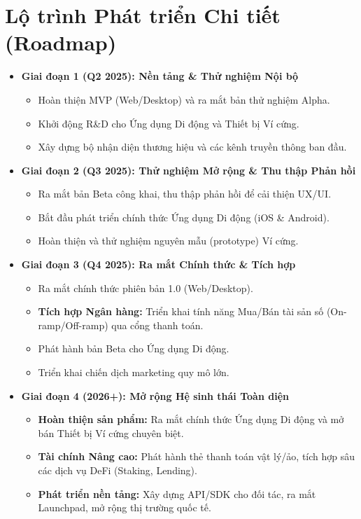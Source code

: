 \section{Lộ trình Phát triển Chi tiết (Roadmap)}

\begin{itemize}
    \item \textbf{Giai đoạn 1 (Q2 2025): Nền tảng \& Thử nghiệm Nội bộ}
    \begin{itemize}
        \item Hoàn thiện MVP (Web/Desktop) và ra mắt bản thử nghiệm Alpha.
        \item Khởi động R\&D cho Ứng dụng Di động và Thiết bị Ví cứng.
        \item Xây dựng bộ nhận diện thương hiệu và các kênh truyền thông ban đầu.
    \end{itemize}

    \item \textbf{Giai đoạn 2 (Q3 2025): Thử nghiệm Mở rộng \& Thu thập Phản hồi}
    \begin{itemize}
        \item Ra mắt bản Beta công khai, thu thập phản hồi để cải thiện UX/UI.
        \item Bắt đầu phát triển chính thức Ứng dụng Di động (iOS \& Android).
        \item Hoàn thiện và thử nghiệm nguyên mẫu (prototype) Ví cứng.
    \end{itemize}

    \item \textbf{Giai đoạn 3 (Q4 2025): Ra mắt Chính thức \& Tích hợp}
    \begin{itemize}
        \item Ra mắt chính thức phiên bản 1.0 (Web/Desktop).
        \item \textbf{Tích hợp Ngân hàng:} Triển khai tính năng Mua/Bán tài sản số (On-ramp/Off-ramp) qua cổng thanh toán.
        \item Phát hành bản Beta cho Ứng dụng Di động.
        \item Triển khai chiến dịch marketing quy mô lớn.
    \end{itemize}

    \item \textbf{Giai đoạn 4 (2026+): Mở rộng Hệ sinh thái Toàn diện}
    \begin{itemize}
        \item \textbf{Hoàn thiện sản phẩm:} Ra mắt chính thức Ứng dụng Di động và mở bán Thiết bị Ví cứng chuyên biệt.
        \item \textbf{Tài chính Nâng cao:} Phát hành thẻ thanh toán vật lý/ảo, tích hợp sâu các dịch vụ DeFi (Staking, Lending).
        \item \textbf{Phát triển nền tảng:} Xây dựng API/SDK cho đối tác, ra mắt Launchpad, mở rộng thị trường quốc tế.
    \end{itemize}
\end{itemize}

